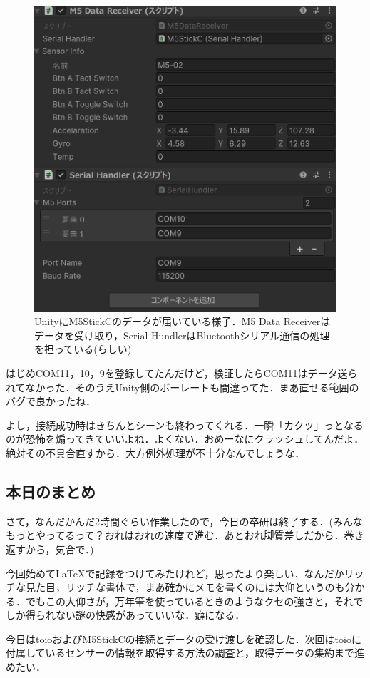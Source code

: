 \documentclass[twocolumn]{mynote}
\begin{document}
\begin{figure}[h]
  \label{m5-getting-sensor}
  \centering
  \includegraphics[keepaspectratio, width=0.7\columnwidth]{resources/m5stickc_getting_sensor.png}
  \caption[short]{UnityにM5StickCのデータが届いている様子．M5 Data Receiverはデータを受け取り，Serial HundlerはBluetoothシリアル通信の処理を担っている(らしい)}
\end{figure}

はじめCOM11，10，9を登録してたんだけど，検証したらCOM11はデータ送られてなかった．そのうえUnity側のボーレートも間違ってた．まあ直せる範囲のバグで良かったね．

よし，接続成功時はきちんとシーンも終わってくれる．一瞬「カクッ」っとなるのが恐怖を煽ってきていいよね．よくない．おめーなにクラッシュしてんだよ．絶対その不具合直すから．大方例外処理が不十分なんでしょうな．

\subsection*{本日のまとめ}
さて，なんだかんだ2時間ぐらい作業したので，今日の卒研は終了する．(みんなもっとやってるって？おれはおれの速度で進む．あとおれ脚質差しだから．巻き返すから，気合で．)

今回始めて\LaTeX で記録をつけてみたけれど，思ったより楽しい．なんだかリッチな見た目，リッチな書体で，まあ確かにメモを書くのには大仰というのも分かる．でもこの大仰さが，万年筆を使っているときのようなクセの強さと，それでしか得られない謎の快感があっていいな．癖になる．

今日はtoioおよびM5StickCの接続とデータの受け渡しを確認した．次回はtoioに付属しているセンサーの情報を取得する方法の調査と，取得データの集約まで進めたい．
\end{document}
